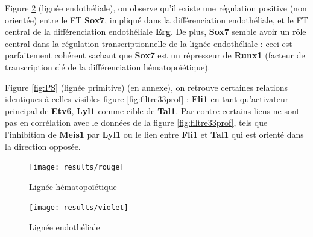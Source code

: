 \documentclass[fleqn,11pt]{SelfArx} %
\begin{document}
\par Figure \ref{fig:4SFG} (lignée endothéliale), on observe qu'il existe une régulation positive (non orientée) entre le FT \textbf{Sox7}, impliqué dans la différenciation endothéliale, et le FT central de la différenciation endothéliale \textbf{Erg}. De plus, \textbf{Sox7} semble avoir un rôle central dans la régulation transcriptionnelle de la lignée endothéliale : ceci est parfaitement cohérent sachant que \textbf{Sox7} est un répresseur de \textbf{Runx1} (facteur de transcription clé de la différenciation hématopoïétique)\cite{Moignard}.

\par Figure \ref{fig:PS} (lignée primitive) (en annexe), on retrouve certaines relations identiques à celles visibles figure \ref{fig:filtre33prof} : \textbf{Fli1} en tant qu'activateur principal de \textbf{Etv6}, \textbf{Lyl1} comme cible de \textbf{Tal1}. Par contre certains liens ne sont pas en corrélation avec le données de la figure \ref{fig:filtre33prof}, tels que l'inhibition de \textbf{Meis1} par \textbf{Lyl1} ou le lien entre \textbf{Fli1} et \textbf{Tal1} qui est orienté dans la direction opposée. 

\begin{figure}[ht]
\centering
\texttt{[image: results/rouge]}
\caption{Lignée hématopoïétique}
\label{fig:4SG}
\end{figure}

\begin{figure}[ht]
\centering
\texttt{[image: results/violet]}
\caption{Lignée endothéliale}
\label{fig:4SFG}
\end{figure}
\end{document}
